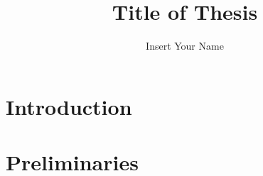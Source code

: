 \documentclass[12pt]{puthesis}
\title{Title of Thesis}
\author{Insert Your Name}
\begin{document}
\chapter{Introduction}  %

\chapter{Preliminaries}  %

% 
\end{document}
